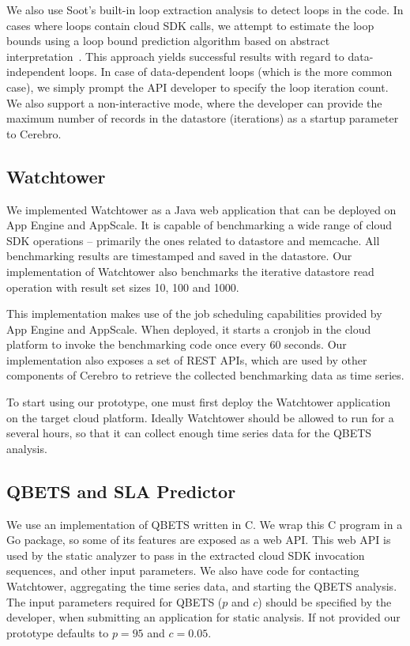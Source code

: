 We also use Soot's built-in loop extraction analysis
to detect loops in the code. In cases where loops contain cloud SDK calls, we attempt to estimate
the loop bounds using a loop bound prediction algorithm based on abstract interpretation~\cite{bygde2010static}. This
approach yields successful results with regard to data-independent loops. In case of data-dependent
loops (which is the more common case), we simply prompt the API developer to specify the loop iteration
count. We also support a non-interactive mode, where the developer can provide the maximum number of
records in the datastore (iterations) as a startup parameter to Cerebro.%

\subsection{Watchtower}
We implemented Watchtower as a Java web application that can be deployed on App Engine and
AppScale. It is capable of benchmarking a wide range of cloud SDK operations
-- primarily the ones related to datastore and memcache. All benchmarking results are timestamped and 
saved in the datastore. Our implementation of Watchtower also benchmarks the iterative datastore read operation
with result set sizes 10, 100 and 1000. 

This implementation makes use of the job scheduling capabilities provided by App
Engine and AppScale. When deployed, it starts a cronjob in the cloud platform to invoke the benchmarking code
once every 60 seconds. Our implementation also exposes a set of REST APIs, which
are used by other components of Cerebro to retrieve the collected benchmarking data as time series.

To start using our prototype, one must first deploy the Watchtower application on the target cloud platform. 
Ideally Watchtower should be allowed to run for a several hours,
so that it can collect enough time series data for the QBETS analysis. 

\subsection{QBETS and SLA Predictor}
We use an implementation of QBETS written in C. We wrap this C program in a Go package, so some 
of its features are exposed as a web API. This web API is used by the static analyzer to pass in the extracted
cloud SDK invocation sequences, and other input parameters. We also have code for contacting Watchtower, 
aggregating the time series data, and starting the QBETS analysis.
The input parameters required for QBETS ($p$ and $c$) should be specified by the
developer, when submitting an application for static analysis.
If not provided our prototype defaults to $p=95$ and $c=0.05$. 

